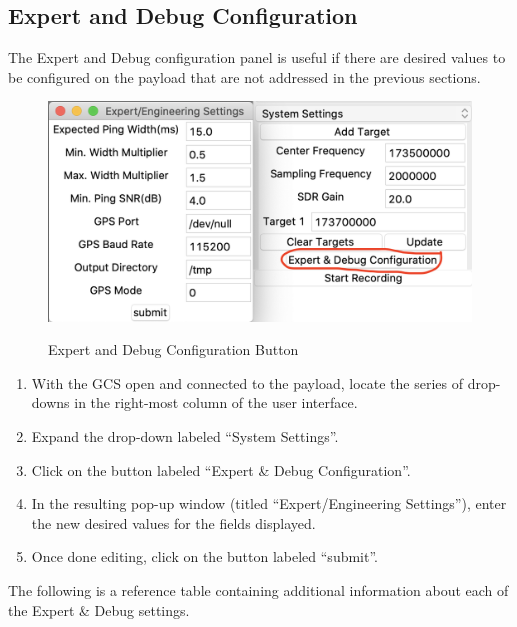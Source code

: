 \documentclass{report}
\begin{document}
		\subsection{Expert and Debug Configuration}
			The Expert and Debug configuration panel is useful if there are desired values to be configured on the payload that are not addressed in the previous sections.
			\begin{figure}[htb]
				\centering
				\caption{Expert and Debug Configuration Button}
				\includegraphics[scale=0.5]{expert_debug.jpg}
				\label{fig:expert_debug}
			\end{figure}
			\begin{enumerate}
				\item With the GCS open and connected to the payload, locate the series of drop-downs in the right-most column of the user interface.
				\item Expand the drop-down labeled ``System Settings''.
				\item Click on the button labeled ``Expert \& Debug Configuration''.
				\item In the resulting pop-up window (titled ``Expert/Engineering Settings''), enter the new desired values for the fields displayed.
				\item Once done editing, click on the button labeled ``submit''.
			\end{enumerate}
			The following is a reference table containing additional information about each of the Expert \& Debug settings.
\end{document}
